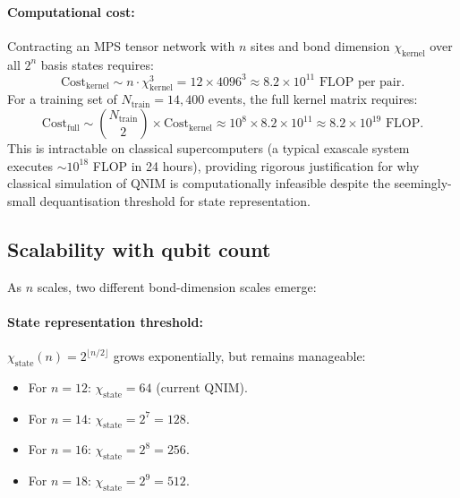 \documentclass[11pt,a4paper, english]{book}
\theoremstyle{plain}
\theoremstyle{definition}
\numberwithin{equation}{chapter}
\numberwithin{figure}{chapter}
\numberwithin{table}{chapter}
\begin{document}
\paragraph{Computational cost:} Contracting an MPS tensor network with $n$ sites and 
bond dimension $\chi_\mathrm{kernel}$ over all $2^n$ basis states requires:
\begin{equation}
  \label{eq:kernel_contraction_cost}
  \text{Cost}_\mathrm{kernel} \sim n \cdot \chi_\mathrm{kernel}^3 = 12 \times 4096^3 
  \approx 8.2 \times 10^{11} \text{ FLOP per pair}.
\end{equation}
For a training set of $N_\mathrm{train} = 14{,}400$ events, the full kernel matrix requires:
\begin{equation}
  \label{eq:kernel_full_cost}
  \text{Cost}_\mathrm{full} \sim \binom{N_\mathrm{train}}{2} \times \text{Cost}_\mathrm{kernel}
  \approx 10^8 \times 8.2 \times 10^{11} \approx 8.2 \times 10^{19} \text{ FLOP}.
\end{equation}
This is intractable on classical supercomputers (a typical exascale system executes
$\sim 10^{18}$ FLOP in 24 hours), providing rigorous justification for why 
classical simulation of QNIM is computationally infeasible despite the 
seemingly-small dequantisation threshold for state representation.

\subsection{Scalability with qubit count}

As $n$ scales, two different bond-dimension scales emerge:

\paragraph{State representation threshold:} $\chi_\mathrm{state}(n) = 2^{\lfloor n/2 \rfloor}$ grows exponentially,
but remains manageable:
\begin{itemize}
  \item For $n = 12$: $\chi_\mathrm{state} = 64$ (current QNIM).
  \item For $n = 14$: $\chi_\mathrm{state} = 2^7 = 128$.
  \item For $n = 16$: $\chi_\mathrm{state} = 2^8 = 256$.
  \item For $n = 18$: $\chi_\mathrm{state} = 2^9 = 512$.
\end{itemize}
\end{document}
